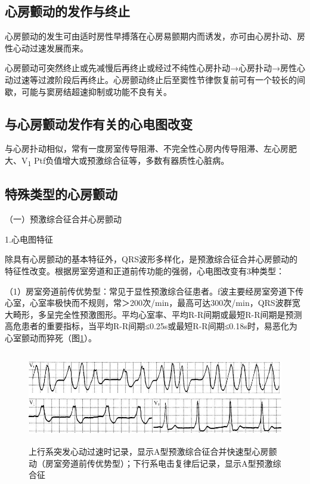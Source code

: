 \protect\hypertarget{text00020.htmlux5cux23subid208}{}{}

\subsection{心房颤动的发作与终止}

心房颤动的发生可由适时房性早搏落在心房易颤期内而诱发，亦可由心房扑动、房性心动过速发展而来。

心房颤动可突然终止或先减慢后再终止或经过不纯性心房扑动→心房扑动→房性心动过速等过渡阶段后再终止。心房颤动终止后至窦性节律恢复前可有一个较长的间歇，可能与窦房结超速抑制或功能不良有关。

\protect\hypertarget{text00020.htmlux5cux23subid209}{}{}

\subsection{与心房颤动发作有关的心电图改变}

与心房扑动相似，常有一度房室传导阻滞、不完全性心房内传导阻滞、左心房肥大、V\textsubscript{1}
Ptf负值增大或预激综合征等，多数有器质性心脏病。

\protect\hypertarget{text00020.htmlux5cux23subid210}{}{}

\subsection{特殊类型的心房颤动}

（一）预激综合征合并心房颤动

1.心电图特征

除具有心房颤动的基本特征外，QRS波形多样化，是预激综合征合并心房颤动的特征性改变。根据房室旁道和正道前传功能的强弱，心电图改变有3种类型：

（1）房室旁道前传优势型：常见于显性预激综合征患者。f波主要经房室旁道下传心室，心室率极快而不规则，常＞200次/min，最高可达300次/min，QRS波群宽大畸形，多呈完全性预激图形。平均心室率、平均R-R间期或最短R-R间期是预测高危患者的重要指标，当平均R-R间期≤0.25s或最短R-R间期≤0.18s时，易恶化为心室颤动而猝死（图\ref{fig13-28}）。

\begin{figure}[!htbp]
 \centering
 \includegraphics[width=5.58333in,height=1.58333in]{./images/Image00236.jpg}
 \captionsetup{justification=centering}
 \caption{上行系突发心动过速时记录，显示A型预激综合征合并快速型心房颤动（房室旁道前传优势型）；下行系电击复律后记录，显示A型预激综合征}
 \label{fig13-28}
  \end{figure} 

